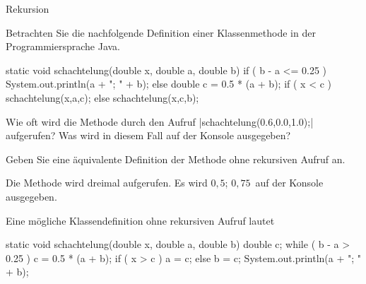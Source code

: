 \begin{exercise}{Rekursion}
\begin{body}
Betrachten Sie die nachfolgende Definition einer Klassenmethode in der Programmiersprache Java.
\begin{displaycode}
    static void schachtelung(double x, double a, double b) {
        if ( b - a <= 0.25 ) {
            System.out.println(a + "; " + b);
        } else {
            double c = 0.5 * (a + b);
            if ( x < c ) {
                schachtelung(x,a,c);
            } else {
                schachtelung(x,c,b);
            }
        }
    }
\end{displaycode}
\begin{parts}
\item
Wie oft wird die Methode durch den Aufruf \code|schachtelung(0.6,0.0,1.0);| aufgerufen? Was wird in diesem Fall auf der Konsole ausgegeben?

\item
Geben Sie eine äquivalente Definition der Methode ohne rekursiven Aufruf an.
\end{parts}
\end{body}

\begin{solution}
\begin{parts}
\item
Die Methode wird dreimal aufgerufen. Es wird \glqq$0{,}5$; $0{,}75$\grqq\ auf der Konsole ausgegeben.

\item
Eine mögliche Klassendefinition ohne rekursiven Aufruf lautet
\begin{displaycode}
    static void schachtelung(double x, double a, double b) {
        double c;
        while ( b - a > 0.25  ) {
            c = 0.5 * (a + b);
            if ( x > c ) {
                a = c;
            } else {
                b = c;
            }
        }
        System.out.println(a + "; " + b);
    }
\end{displaycode}
\end{parts}
\end{solution}
\end{exercise}
